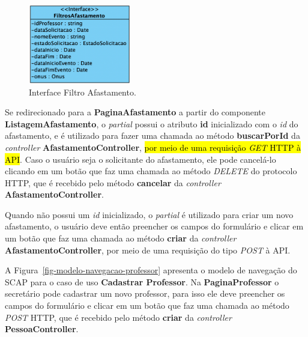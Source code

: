 \begin{figure}
    \centering
    \includegraphics[width=0.4\textwidth]{figuras/fig-interface-filtro-afast.png}
    \caption{Interface Filtro Afastamento.}
    \label{fig-interface-filtro-afast}
\end{figure}

Se redirecionado para a \textbf{PaginaAfastamento} a partir do componente \textbf{ListagemAfastamento},
o \textit{partial} possui o atributo \textbf{id} inicializado com o \textit{id} do afastamento, e é
utilizado para fazer uma chamada ao método \textbf{buscarPorId} da \textit{controller} \textbf{AfastamentoController}, \hl{por
meio de uma requisição \textit{GET} HTTP à API}.
Caso o usuário seja o solicitante do afastamento, ele pode cancelá-lo clicando em um botão que faz uma chamada ao método \textit{DELETE}
do protocolo HTTP, que é recebido pelo método \textbf{cancelar} da \textit{controller} \textbf{AfastamentoController}.


Quando não possui um \textit{id} inicializado, o \textit{partial} é utilizado para criar um novo afastamento,
o usuário deve então preencher os campos do formulário e clicar em um botão que faz uma chamada ao método
\textbf{criar} da \textit{controller} \textbf{AfastamentoController}, por meio de uma requisição do tipo \textit{POST} à API.

A Figura~\ref{fig-modelo-navegacao-professor} apresenta o modelo de navegação do SCAP para o caso de uso
\textbf{Cadastrar Professor}. Na \textbf{PaginaProfessor} o secretário pode cadastrar um novo professor,
para isso ele deve preencher os campos do formulário e clicar em um botão que faz uma chamada ao método \textit{POST} HTTP,
que é recebido pelo método \textbf{criar} da \textit{controller} \textbf{PessoaController}.



